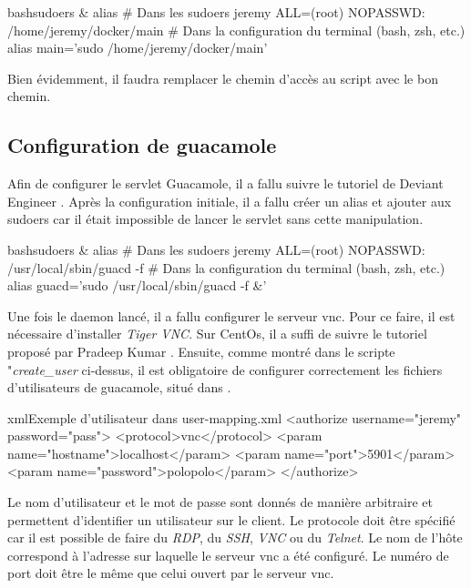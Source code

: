 
\begin{listingsbox}{bash}{sudoers \& alias}
# Dans les sudoers
jeremy ALL=(root) NOPASSWD: /home/jeremy/docker/main
# Dans la configuration du terminal (bash, zsh, etc.)
alias main='sudo /home/jeremy/docker/main'
\end{listingsbox}
Bien évidemment, il faudra remplacer le chemin d'accès au script avec le bon chemin.


\subsection{Configuration de guacamole}

Afin de configurer le servlet Guacamole, il a fallu suivre le tutoriel de Deviant Engineer \cite{guac}.
Après la configuration initiale, il a fallu créer un alias et ajouter  aux sudoers car il était impossible de lancer le servlet sans cette manipulation.
\begin{listingsbox}{bash}{sudoers \& alias}
# Dans les sudoers
jeremy ALL=(root) NOPASSWD: /usr/local/sbin/guacd -f
# Dans la configuration du terminal (bash, zsh, etc.)
alias guacd='sudo /usr/local/sbin/guacd -f &'
\end{listingsbox}
Une fois le daemon lancé, il a fallu configurer le serveur \acrshort{vnc}.
Pour ce faire, il est nécessaire d'installer \textit{Tiger VNC}.
Sur CentOs, il a suffi de suivre le tutoriel proposé par Pradeep Kumar \cite{vnc_conf}.
Ensuite, comme montré dans le scripte "\textit{create\_user} ci-dessus, il est obligatoire de configurer correctement les fichiers d'utilisateurs de guacamole, situé dans .
\begin{listingsbox}{xml}{Exemple d'utilisateur dans user-mapping.xml}
<authorize username="jeremy" password="pass">
	<protocol>vnc</protocol>
	<param name="hostname">localhost</param>
	<param name="port">5901</param>
	<param name="password">polopolo</param>
</authorize>
\end{listingsbox}
Le nom d'utilisateur et le mot de passe sont donnés de manière arbitraire et permettent d'identifier un utilisateur sur le client.
Le protocole doit être spécifié car il est possible de faire du \textit{RDP}, du \textit{SSH}, \textit{VNC} ou du \textit{Telnet}.
Le nom de l'hôte correspond à l'adresse sur laquelle le serveur \acrshort{vnc} a été configuré.
Le numéro de port doit être le même que celui ouvert par le serveur \acrshort{vnc}.
